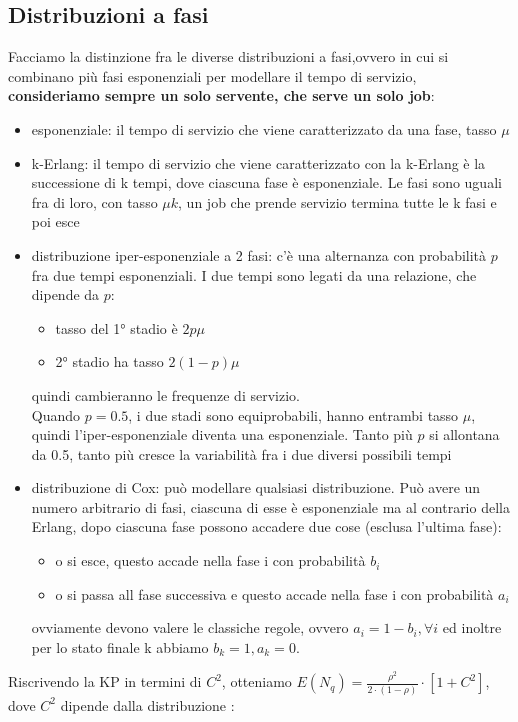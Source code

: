 \documentclass{article}
\begin{document}
\subsection{Distribuzioni a fasi}
Facciamo la distinzione fra le diverse distribuzioni a fasi,ovvero in cui si combinano più fasi esponenziali per modellare il tempo di servizio, \textbf{consideriamo sempre un solo servente, che serve un solo job}:
\begin{itemize}
\item esponenziale: il tempo di servizio che viene caratterizzato da una fase, tasso $\mu$
\item k-Erlang: il tempo di servizio che viene caratterizzato con la k-Erlang è la successione di k tempi, dove ciascuna fase è esponenziale. Le fasi sono uguali fra di loro, con tasso $\mu k$, un job che prende servizio termina tutte le k fasi e poi esce
\item distribuzione iper-esponenziale a 2 fasi: c'è una alternanza con probabilità $p$ fra due tempi esponenziali. I due tempi sono legati da una relazione, che dipende da $p$:
\begin{itemize}
\item tasso del 1° stadio è $2p\mu$
\item 2° stadio ha tasso $2(1-p)\mu$
\end{itemize}
quindi cambieranno le frequenze di servizio.\\ Quando $p = 0.5$, i due stadi sono equiprobabili, hanno entrambi tasso $\mu$, quindi l'iper-esponenziale diventa una esponenziale. Tanto più $p$ si allontana da 0.5, tanto più cresce la variabilità fra i due diversi possibili tempi
\item distribuzione di Cox: può modellare qualsiasi distribuzione. Può avere un numero arbitrario di fasi, ciascuna di esse è esponenziale ma al contrario della Erlang, dopo ciascuna fase possono accadere due cose (esclusa l'ultima fase):
\begin{itemize}
\item o si esce, questo accade nella fase i con probabilità $b_i$
\item o si passa all fase successiva e questo accade nella fase i con probabilità $a_i$
\end{itemize}
ovviamente devono valere le classiche regole, ovvero $a_i = 1 - b_i,  \forall i$ ed inoltre per lo stato finale k abbiamo $b_k =1, a_k = 0$.
\end{itemize}
Riscrivendo la KP in termini di $C^2$, otteniamo $E(N_q) = \frac{\rho^2}{2\cdot (1 - \rho)} \cdot [1 + C^2]$, dove $C^2$ dipende dalla distribuzione :
\end{document}
